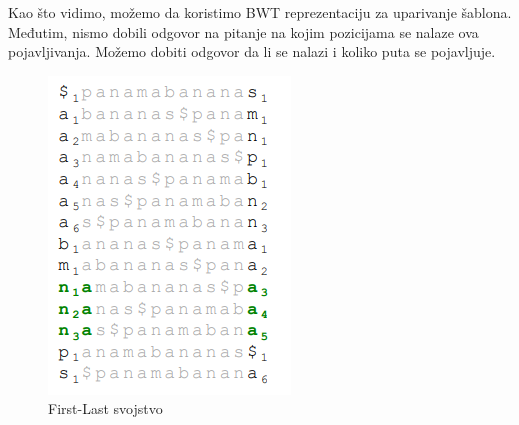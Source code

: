 Kao što vidimo, možemo da koristimo BWT reprezentaciju za uparivanje šablona. Međutim, nismo dobili odgovor na pitanje na kojim pozicijama se nalaze ova pojavljivanja. Možemo dobiti odgovor da li se nalazi i koliko puta se pojavljuje.


\begin{minipage}{\textwidth}
	\centering
	\begin{minipage}{0.45\textwidth}
		\begin{figure}[H]
			\centering
			\includegraphics[width=\textwidth]{poglavlja/9/slike/traziAnukraj1.png}
			\caption{First-Last svojstvo}
			\label{ana1}
		\end{figure} 
	\end{minipage}
	\hfill 
	\begin{minipage}{0.45\textwidth}
		\begin{figure}[H]
			\centering

\end{figure}
\end{minipage}
\end{minipage}
